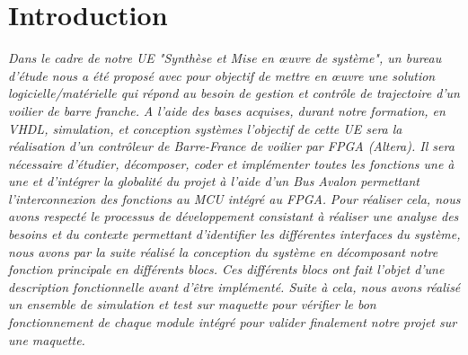 \section*{Introduction}
\label{Introduction}
\textit{Dans le cadre de notre UE "Synthèse et Mise en œuvre de système", un bureau d'étude nous a été proposé avec pour objectif de mettre en œuvre une solution logicielle/matérielle qui répond au besoin de gestion et contrôle de trajectoire d'un voilier de barre franche.}\vspace{0.5cm}
\textit{\newline A l'aide des bases acquises, durant notre formation, en VHDL, simulation, et conception systèmes l'objectif de cette UE sera la réalisation d'un contrôleur de Barre-France de voilier par FPGA (Altera). Il sera nécessaire d'étudier, décomposer, coder et implémenter toutes les fonctions une à une et d'intégrer la globalité du projet à l'aide d'un Bus Avalon permettant l'interconnexion des fonctions au MCU intégré au FPGA.}\vspace{0.5cm}
\textit{\newline Pour réaliser cela, nous avons respecté le processus de développement consistant à réaliser une analyse  des besoins et du contexte permettant d'identifier les différentes interfaces du système, nous avons par la suite réalisé la conception du système en décomposant notre fonction principale en différents blocs. Ces différents blocs ont fait l'objet d'une description fonctionnelle avant d'être implémenté. Suite à cela, nous avons réalisé un ensemble de simulation et test sur maquette pour vérifier le bon fonctionnement de chaque module intégré pour valider finalement notre projet sur une maquette.}